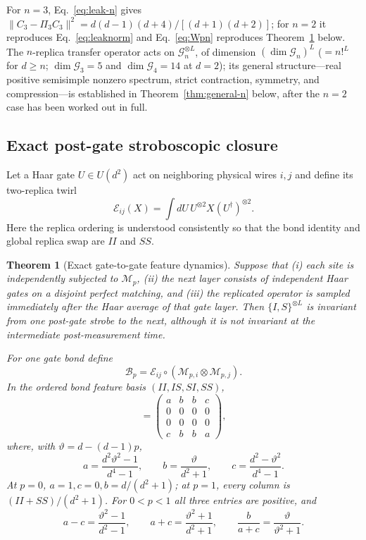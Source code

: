 \documentclass[aps,prx,reprint,superscriptaddress,nobibnotes,longbibliography]{revtex4-2}
\newtheorem{theorem}{Theorem}
\theoremstyle{remark}
\newcommand{\vth}{\vartheta}
\begin{document}
For $n=3$, Eq.~\eqref{eq:leak-n} gives $\|C_3-\Pi_3C_3\|^2=d(d-1)(d+4)/[(d+1)(d+2)]$; for $n=2$ it reproduces Eq.~\eqref{eq:leaknorm} and Eq.~\eqref{eq:Wpn} reproduces Theorem~\ref{thm:strobe} below.  The $n$-replica transfer operator acts on $\mathcal G_n^{\otimes L}$, of dimension $(\dim\mathcal G_n)^L$ ($=n!^L$ for $d\ge n$; $\dim\mathcal G_3=5$ and $\dim\mathcal G_4=14$ at $d=2$); its general structure---real positive semisimple nonzero spectrum, strict contraction, symmetry, and compression---is established in Theorem~\ref{thm:general-n} below, after the $n=2$ case has been worked out in full.

\subsection{Exact post-gate stroboscopic closure}

Let a Haar gate $U\in U(d^2)$ act on neighboring physical wires $i,j$ and define its two-replica twirl
\begin{equation}
 \mathcal E_{ij}(X)=\int dU\,U^{\otimes2}X(U^\dagger)^{\otimes2}.
 \label{eq:Etwirl}
\end{equation}
Here the replica ordering is understood consistently so that the bond identity and global replica swap are $II$ and $SS$.

\begin{theorem}[Exact gate-to-gate feature dynamics]
\label{thm:strobe}
Suppose that (i) each site is independently subjected to $\mathcal M_p$, (ii) the next layer consists of independent Haar gates on a disjoint perfect matching, and (iii) the replicated operator is sampled immediately after the Haar average of that gate layer.  Then $\{I,S\}^{\otimes L}$ is invariant from one post-gate strobe to the next, although it is not invariant at the intermediate post-measurement time.

For one gate bond define
\begin{equation}
 \mathcal B_p=\mathcal E_{ij}\circ(\mathcal M_{p,i}\otimes\mathcal M_{p,j}).
 \label{eq:Bpdef}
\end{equation}
In the ordered bond feature basis $(II,IS,SI,SS)$,
\begin{equation}
 [\mathcal B_p]=
 \begin{pmatrix}
 a&b&b&c\\0&0&0&0\\0&0&0&0\\c&b&b&a
 \end{pmatrix},
 \label{eq:Bpmatrix}
\end{equation}
where, with $\vth=d-(d-1)p$,
\begin{equation}
 a=\frac{d^2\vth^2-1}{d^4-1},\qquad
 b=\frac{\vth}{d^2+1},\qquad
 c=\frac{d^2-\vth^2}{d^4-1}.
 \label{eq:abc}
\end{equation}
At $p=0$, $a=1,c=0,b=d/(d^2+1)$; at $p=1$, every column is $(II+SS)/(d^2+1)$.  For $0<p<1$ all three entries are positive, and
\begin{equation}
 a-c=\frac{\vth^2-1}{d^2-1},\qquad a+c=\frac{\vth^2+1}{d^2+1},\qquad \frac{b}{a+c}=\frac{\vth}{\vth^2+1}.
 \label{eq:abc-combos}
\end{equation}
\end{theorem}
\end{document}
